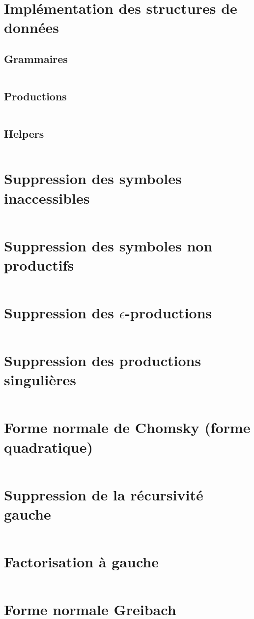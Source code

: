 \documentclass[frenchb]{article}
\begin{document}
\section{Implémentation des structures de données}
\subsection{Grammaires}
\inputminted[bgcolor=Black]{python}{gramz/grammar.py}
\subsection{Productions}
\inputminted[bgcolor=Black]{python}{gramz/production.py}
\subsection{Helpers}
\inputminted[bgcolor=Black]{python}{gramz/helpers.py}

\section{Suppression des symboles inaccessibles}
\inputminted[bgcolor=Black]{python}{gramz/transfo/remove_unreachable.py}

\section{Suppression des symboles non productifs}
\inputminted[bgcolor=Black]{python}{gramz/transfo/remove_unproductive.py}

\section{Suppression des $\epsilon$-productions}
\inputminted[bgcolor=Black]{python}{gramz/transfo/remove_epsilon.py}

\section{Suppression des productions singulières}
\inputminted[bgcolor=Black]{python}{gramz/transfo/remove_unit.py}

\section{Forme normale de Chomsky (forme quadratique)}
\inputminted[bgcolor=Black]{python}{gramz/transfo/chomsky_normal_form.py}

\section{Suppression de la récursivité gauche}
\inputminted[bgcolor=Black]{python}{gramz/transfo/remove_left_recursion.py}

\section{Factorisation à gauche}
\inputminted[bgcolor=Black]{python}{gramz/transfo/factorize.py}

\section{Forme normale Greibach}
\inputminted[bgcolor=Black]{python}{gramz/transfo/greibach_normal_form.py}
\end{document}
